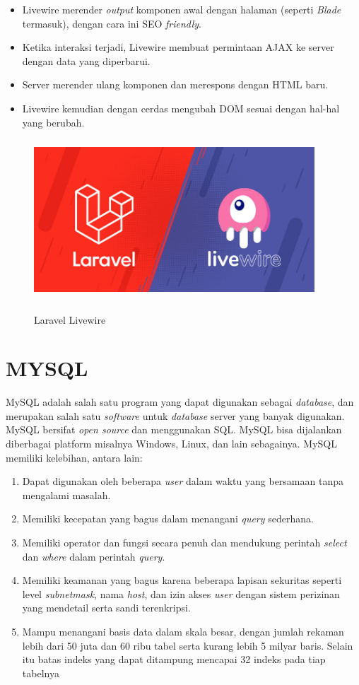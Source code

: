 \begin{itemize}
	\item Livewire merender \textit{output} komponen awal dengan halaman (seperti \textit{Blade} termasuk), dengan cara ini SEO \textit{friendly}.
	\item Ketika interaksi terjadi, Livewire membuat permintaan AJAX ke server dengan data yang diperbarui.
	\item Server merender ulang komponen dan merespons dengan HTML baru.
	\item Livewire kemudian dengan cerdas mengubah DOM sesuai dengan hal-hal yang berubah.
\end{itemize}

\begin{figure}[H]
\centering
{\includegraphics [width = 10.5cm, height= 6cm]{gambar/laravel-livewire}}
\caption{Laravel Livewire \citep{krishaweb2021}}
\label{laravel_livewire}
\end{figure}

\section{\uppercase{MySQL}}
MySQL adalah salah satu program yang dapat digunakan sebagai \textit{database}, dan merupakan salah satu \textit{software} untuk \textit{database} server yang banyak digunakan. MySQL bersifat \textit{open source} dan menggunakan SQL. MySQL bisa dijalankan diberbagai platform misalnya Windows, Linux, dan lain sebagainya. MySQL memiliki kelebihan, antara lain: \citep{orlando2017aplikasi}

\begin{enumerate}
	\item Dapat digunakan oleh beberapa \textit{user} dalam waktu yang bersamaan tanpa mengalami masalah.	
	\item Memiliki kecepatan yang bagus dalam menangani \textit{query} sederhana.
	\item Memiliki operator dan fungsi secara penuh dan mendukung perintah \textit{select} dan \textit{where} dalam perintah \textit{query}.
	\item Memiliki keamanan yang bagus karena beberapa lapisan sekuritas seperti level \textit{subnetmask}, nama \textit{host}, dan izin akses \textit{user} dengan sistem perizinan yang mendetail serta sandi terenkripsi.
	\item Mampu menangani basis data dalam skala besar, dengan jumlah rekaman lebih dari 50 juta dan 60 ribu tabel serta kurang lebih 5 milyar baris. Selain itu batas indeks yang dapat ditampung mencapai 32 indeks pada tiap tabelnya
\end{enumerate}

